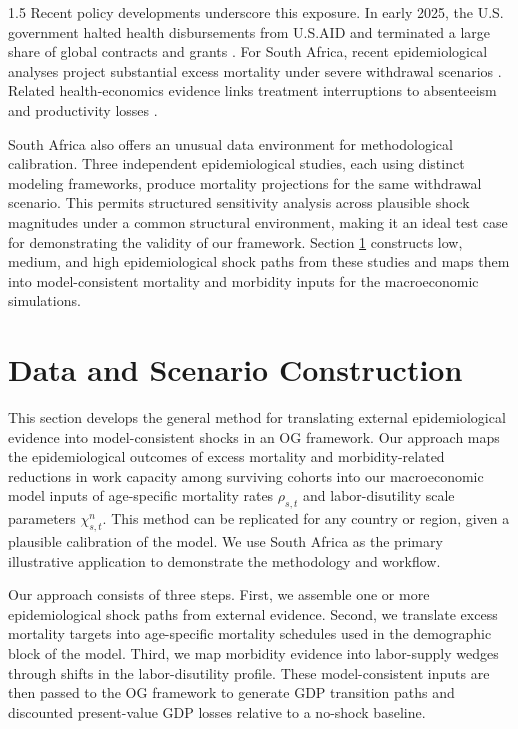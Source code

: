 \documentclass[letterpaper,12pt]{article}
\theoremstyle{definition}
\begin{document}
\begin{spacing}{1.5}
  Recent policy developments underscore this exposure. In early 2025, the U.S. government halted health disbursements from U.S.AID and terminated a large share of global contracts and grants \citep{Cohen2025}. For South Africa, recent epidemiological analyses project substantial excess mortality under severe withdrawal scenarios \citep{Brink2025,Gandhi2025,KS2025}. Related health-economics evidence links treatment interruptions to absenteeism and productivity losses \citep{Keogh2024,Panda2024}.

  South Africa also offers an unusual data environment for methodological calibration. Three independent epidemiological studies, each using distinct modeling frameworks, produce mortality projections for the same withdrawal scenario. This permits structured sensitivity analysis across plausible shock magnitudes under a common structural environment, making it an ideal test case for demonstrating the validity of our framework. Section \ref{SecData} constructs low, medium, and high epidemiological shock paths from these studies and maps them into model-consistent mortality and morbidity inputs for the macroeconomic simulations.


\section{Data and Scenario Construction}\label{SecData}

This section develops the general method for translating external epidemiological evidence into model-consistent shocks in an OG framework. Our approach maps the epidemiological outcomes of excess mortality and morbidity-related reductions in work capacity among surviving cohorts into our macroeconomic model inputs of age-specific mortality rates $\rho_{s,t}$ and labor-disutility scale parameters $\chi^n_{s,t}$. This method can be replicated for any country or region, given a plausible calibration of the model. We use South Africa as the primary illustrative application to demonstrate the methodology and workflow.

Our approach consists of three steps. First, we assemble one or more epidemiological shock paths from external evidence. Second, we translate excess mortality targets into age-specific mortality schedules used in the demographic block of the model. Third, we map morbidity evidence into labor-supply wedges through shifts in the labor-disutility profile. These model-consistent inputs are then passed to the OG framework to generate GDP transition paths and discounted present-value GDP losses relative to a no-shock baseline.


\end{spacing}
\end{document}
